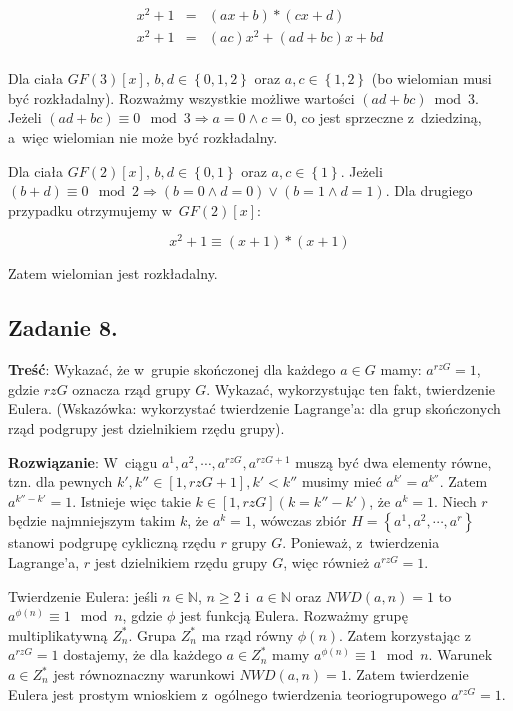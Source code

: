 \documentclass[a4paper,10pt, twocolumn]{article}
\begin{document}
\begin{equation*}
	\begin{array}{lcl} x^{2} + 1 & = & (ax + b) * (cx + d) \\ x^{2} + 1 & = & (ac)x^{2} + (ad + bc)x + bd \\ \end{array}
\end{equation*}

Dla ciała $GF(3)[x]$, $b, d \in \left\{0, 1, 2\right\}$ oraz $a, c \in \left\{1, 2\right\}$ (bo wielomian musi być rozkładalny). Rozważmy wszystkie możliwe wartości $(ad + bc) \bmod{3}$. Jeżeli $(ad + bc) \equiv 0 \mod 3 \Rightarrow a = 0 \wedge c = 0$, co jest sprzeczne z~dziedziną, a~więc wielomian nie może być rozkładalny.

Dla ciała $GF(2)[x]$, $b, d \in \left\{0, 1\right\}$ oraz $a, c \in \left\{1\right\}$. Jeżeli $(b + d) \equiv 0 \mod 2 \Rightarrow (b = 0 \wedge d = 0) \vee (b = 1 \wedge d = 1)$. Dla drugiego przypadku otrzymujemy w~$GF(2)[x]$:

\begin{equation*}
	x^{2} + 1 \equiv (x+1) * (x+1)
\end{equation*}

Zatem wielomian jest rozkładalny.

\subsection{Zadanie 8.}

\textbf{Treść}: Wykazać, że w~grupie skończonej dla każdego $a \in G$ mamy: $a^{rzG} = 1$, gdzie $rzG$ oznacza rząd grupy $G$. Wykazać, wykorzystując ten fakt, twierdzenie Eulera. (Wskazówka: wykorzystać twierdzenie Lagrange'a: dla grup skończonych rząd podgrupy jest dzielnikiem rzędu grupy).

\textbf{Rozwiązanie}: W~ciągu $a^{1}, a^{2}, \cdots, a^{rzG}, a^{rzG + 1}$ muszą być dwa elementy równe, tzn. dla pewnych $k', k'' \in [1, rzG + 1], k' < k''$ musimy mieć $a^{k'} = a^{k''}$. Zatem $a^{k'' - k'} = 1$. Istnieje więc takie $k \in [1, rzG] (k = k'' - k')$, że $a^{k} = 1$. Niech $r$ będzie najmniejszym takim $k$, że $a^{k} = 1$, wówczas zbiór $H = \left\{a^{1}, a^{2}, \cdots, a^{r}\right\}$ stanowi podgrupę cykliczną rzędu $r$ grupy $G$. Ponieważ, z~twierdzenia Lagrange'a, $r$ jest dzielnikiem rzędu grupy $G$, więc również $a^{rzG} = 1$.

\noindent Twierdzenie Eulera: jeśli $n \in \mathbb{N}$, $n \geq 2$ i~$a \in \mathbb{N}$ oraz $NWD(a, n) = 1$ to $a^{\phi(n)} \equiv 1 \mod n$, gdzie $\phi$ jest funkcją Eulera. Rozważmy grupę multiplikatywną $Z_{n}^{*}$. Grupa $Z_{n}^{*}$ ma rząd równy $\phi(n)$. Zatem korzystając z~$a^{rzG} = 1$ dostajemy, że dla każdego $a \in Z_{n}^{*}$ mamy $a^{\phi(n)} \equiv 1 \mod n$. Warunek $a \in Z_{n}^{*}$ jest równoznaczny warunkowi $NWD(a, n) = 1$. Zatem twierdzenie Eulera jest prostym wnioskiem z~ogólnego twierdzenia teoriogrupowego $a^{rzG} = 1$.
\end{document}
